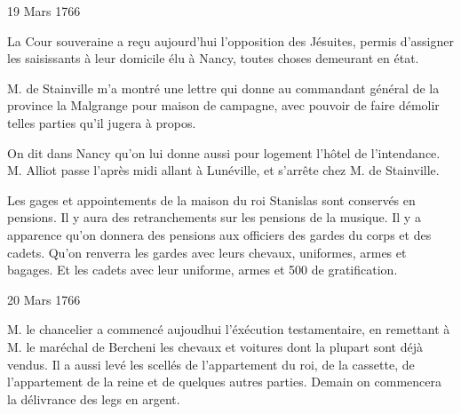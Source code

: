                      
                     \begin{diary}{19 Mars 1766}{}
                        
                        
                           La Cour souveraine a reçu aujourd'hui l'opposition
                           des Jésuites, permis d'assigner
                           les saisissants
                           à leur domicile élu à Nancy,
                           toutes choses
                           demeurant en état. \bigskip
        
        
                        
                           M. de Stainville m'a montré une
                           lettre qui
                           donne au commandant général de
                              la province
                           la Malgrange pour maison de
                           campagne,
                           avec pouvoir de faire démolir telles parties
                           qu'il jugera à propos. \bigskip
        
        
                         On dit dans Nancy qu'on lui donne aussi
                           pour logement l'hôtel de
                              l'intendance.
                           M. Alliot passe l'après midi
                           allant à
                           Lunéville, et s'arrête chez
                           M. de Stainville. \bigskip
        
        
                         Les gages et appointements de la maison du
                           roi Stanislas sont conservés
                           en pensions.
                           Il y aura des retranchements sur les pensions
                           de la musique. Il y a apparence qu'on donnera
                           des pensions aux officiers des gardes du corps
                           et des cadets. Qu'on
                           renverra les gardes avec
                           leurs chevaux, uniformes, armes et bagages.
                           Et les cadets avec leur uniforme, armes et
                           500 de gratification. \bigskip
        
        
                     \end{diary}

                     \begin{diary}{20 Mars 1766}{}
                        
                        
                           M. le chancelier a commencé
                           aujoudhui
                           l'éxécution testamentaire, en remettant à
                           M. le maréchal de Bercheni les chevaux et
                           voitures dont la plupart sont déjà vendus.
                           Il a aussi levé les scellés de l'appartement
                           du roi, de la cassette, de l'appartement de
                           la reine et de
                           quelques autres parties. Demain
                           on commencera la délivrance des legs en argent. \bigskip
        
        
                     \end{diary}

